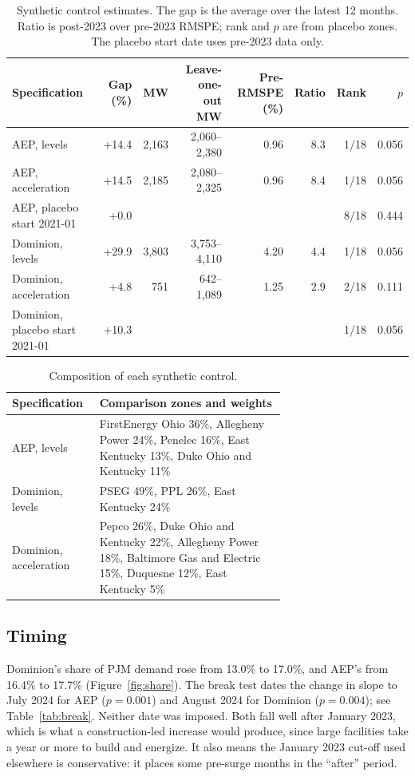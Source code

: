 \documentclass[11pt,a4paper]{article}
\begin{document}
\begin{table}[H]
\centering\footnotesize
\caption{Synthetic control estimates. The gap is the average over the latest 12 months. Ratio is post-2023 over pre-2023 RMSPE; rank and $p$ are from placebo zones. The placebo start date uses pre-2023 data only.}\label{tab:scm}
\begin{tabular}{lrrrrrrr}
\toprule
Specification & Gap (\%) & MW & Leave-one-out MW & Pre-RMSPE (\%) & Ratio & Rank & $p$ \\
\midrule
AEP, levels & +14.4 & 2,163 & 2,060--2,380 & 0.96 & 8.3 & 1/18 & 0.056 \\
AEP, acceleration & +14.5 & 2,185 & 2,080--2,325 & 0.96 & 8.4 & 1/18 & 0.056 \\
AEP, placebo start 2021-01 & +0.0 &  &  &  &  & 8/18 & 0.444 \\
Dominion, levels & +29.9 & 3,803 & 3,753--4,110 & 4.20 & 4.4 & 1/18 & 0.056 \\
Dominion, acceleration & +4.8 & 751 & 642--1,089 & 1.25 & 2.9 & 2/18 & 0.111 \\
Dominion, placebo start 2021-01 & +10.3 &  &  &  &  & 1/18 & 0.056 \\
\bottomrule
\end{tabular}
\end{table}

\begin{table}[H]
\centering\small
\caption{Composition of each synthetic control.}\label{tab:weights}
\begin{tabular}{lp{0.68\linewidth}}
\toprule
Specification & Comparison zones and weights \\
\midrule
AEP, levels & FirstEnergy Ohio 36\%, Allegheny Power 24\%, Penelec 16\%, East Kentucky 13\%, Duke Ohio and Kentucky 11\% \\
Dominion, levels & PSEG 49\%, PPL 26\%, East Kentucky 24\% \\
Dominion, acceleration & Pepco 26\%, Duke Ohio and Kentucky 22\%, Allegheny Power 18\%, Baltimore Gas and Electric 15\%, Duquesne 12\%, East Kentucky 5\% \\
\bottomrule
\end{tabular}
\end{table}


\subsection{Timing}\label{sec:timing}
Dominion's share of PJM demand rose from 13.0\% to 17.0\%, and AEP's from 16.4\% to 17.7\% (Figure~\ref{fig:share}). The break test dates the change in slope to July 2024 for AEP ($p=0.001$) and August 2024 for Dominion ($p=0.004$); see Table~\ref{tab:break}. Neither date was imposed. Both fall well after January 2023, which is what a construction-led increase would produce, since large facilities take a year or more to build and energize. It also means the January 2023 cut-off used elsewhere is conservative: it places some pre-surge months in the ``after'' period.
\end{document}
